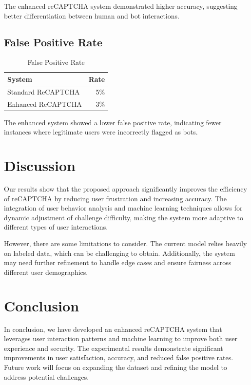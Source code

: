 The enhanced reCAPTCHA system demonstrated higher accuracy, suggesting better differentiation between human and bot interactions.

\subsection{False Positive Rate}
\begin{table}[h]
\centering
\caption{False Positive Rate}
\label{tab:false_positive}
\begin{tabular}{|l|r|}
\hline
\textbf{System} & \textbf{Rate} \\ \hline
Standard ReCAPTCHA & 5\% \\
Enhanced ReCAPTCHA & 3\% \\ \hline
\end{tabular}
\end{table}

The enhanced system showed a lower false positive rate, indicating fewer instances where legitimate users were incorrectly flagged as bots.

\section{Discussion}
Our results show that the proposed approach significantly improves the efficiency of reCAPTCHA by reducing user frustration and increasing accuracy. The integration of user behavior analysis and machine learning techniques allows for dynamic adjustment of challenge difficulty, making the system more adaptive to different types of user interactions.

However, there are some limitations to consider. The current model relies heavily on labeled data, which can be challenging to obtain. Additionally, the system may need further refinement to handle edge cases and ensure fairness across different user demographics.

\section{Conclusion}
In conclusion, we have developed an enhanced reCAPTCHA system that leverages user interaction patterns and machine learning to improve both user experience and security. The experimental results demonstrate significant improvements in user satisfaction, accuracy, and reduced false positive rates. Future work will focus on expanding the dataset and refining the model to address potential challenges.

